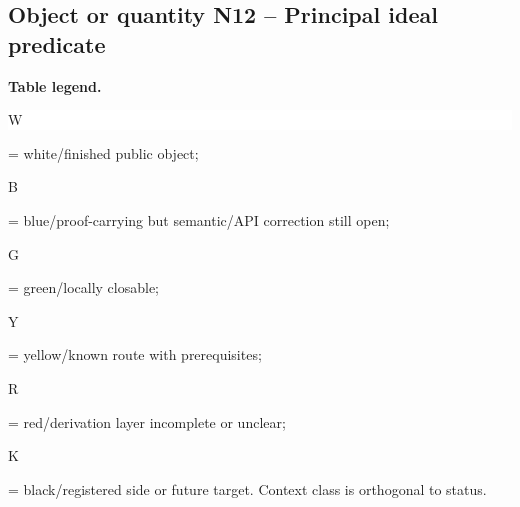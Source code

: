 \subsection*{Object or quantity N12 -- Principal ideal predicate}
\hypertarget{objproof:N12}{}
\par\smallskip\noindent\begin{minipage}{0.99\linewidth}\footnotesize\raggedright\textbf{Table legend.} \colorbox{white}{\strut W} = white/finished public object; \colorbox{cyan!20}{\strut B} = blue/proof-carrying but semantic/API correction still open; \colorbox{green!18}{\strut G} = green/locally closable; \colorbox{yellow!25}{\strut Y} = yellow/known route with prerequisites; \colorbox{red!20}{\strut R} = red/derivation layer incomplete or unclear; \colorbox{black!18}{\strut K} = black/registered side or future target. Context class is orthogonal to status.\end{minipage}\par\vspace{0.25em}
